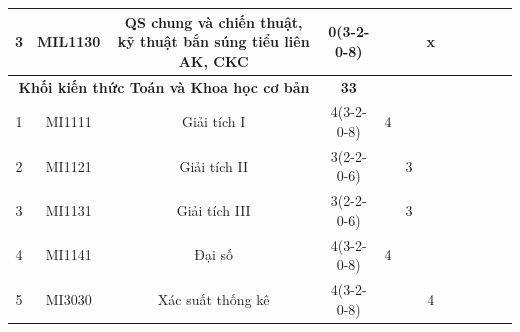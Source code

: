 \documentclass[12pt,a4paper]{report}
\begin{document}
\begin{landscape}
\begin{longtable}[c]{|c|c|c|c|c|c|c|c|c|c|c|c|}
        3                             & MIL1130                         & QS chung và chiến thuật, kỹ thuật bắn súng tiểu liên AK, CKC & 0(3-2-0-8)                                                                           &             &             & x           &             &             &             &             &             \\ \hline
        \multicolumn{3}{|c|}{\textbf{Khối kiến thức Toán và Khoa học cơ bản}}                                                          & \textbf{33}                                                                          &             &             &             &             &             &             &             &             \\ \hline
        1                             & MI1111                          & Giải tích I                                                  & 4(3-2-0-8)                                                                           & 4           &             &             &             &             &             &             &             \\ \hline
        2                             & MI1121                          & Giải tích II                                                 & 3(2-2-0-6)                                                                           &             & 3           &             &             &             &             &             &             \\ \hline
        3                             & MI1131                          & Giải tích III                                                & 3(2-2-0-6)                                                                           &             & 3           &             &             &             &             &             &             \\ \hline
        4                             & MI1141                          & Đại số                                                       & 4(3-2-0-8)                                                                           & 4           &             &             &             &             &             &             &             \\ \hline
        5                             & MI3030                          & Xác suất thống kê                                            & 4(3-2-0-8)                                                                           &             &             & 4           &             &             &             &             &             \\ \hline

\end{longtable}
\end{landscape}
\end{document}
